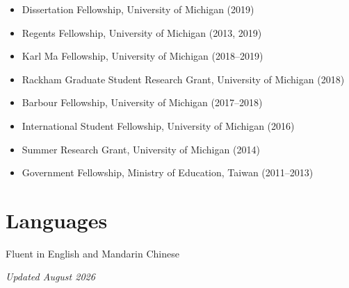 \documentclass[11pt,letterpaper]{article}
\begin{document}
\begin{itemize}[leftmargin=15pt, itemsep=2pt, parsep=0pt]
    \item Dissertation Fellowship, University of Michigan (2019)
    \item Regents Fellowship, University of Michigan (2013, 2019)
    \item Karl Ma Fellowship, University of Michigan (2018--2019)
    \item Rackham Graduate Student Research Grant, University of Michigan (2018)
    \item Barbour Fellowship, University of Michigan (2017--2018)
    \item International Student Fellowship, University of Michigan (2016)
    \item Summer Research Grant, University of Michigan (2014)
    \item Government Fellowship, Ministry of Education, Taiwan (2011--2013)
\end{itemize}

\section*{Languages}

Fluent in English and Mandarin Chinese

\vfill
\begin{center}
\textit{Updated August 2026}
\end{center}
\end{document}
